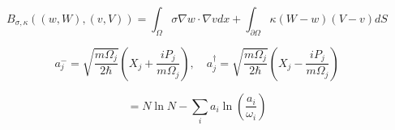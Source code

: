 \documentclass[12pt, a4paper, oneside]{ctexart}
\begin{document}
\begin{equation}
    B_{\sigma,\kappa}((w,W),(v,V)) = \int_{\Omega} \sigma \nabla w \cdot \nabla v dx + \int_{\partial\Omega} \kappa(W-w)(V-v) dS
\end{equation}

\begin{equation}
    a_j^- = \sqrt{\frac{m\Omega_j}{2\hbar}} \left( X_j + \frac{iP_j}{m\Omega_j} \right), \quad a_j^\dagger = \sqrt{\frac{m\Omega_j}{2\hbar}} \left( X_j - \frac{iP_j}{m\Omega_j} \right)
\end{equation}

\begin{equation*}
    =N \ln N - \sum_{i} a_i \ln \left( \frac{a_i}{\omega_i} \right)
\end{equation*}
\end{document}
